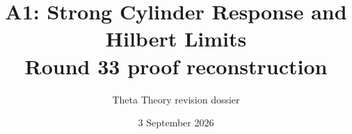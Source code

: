 \documentclass[11pt]{article}
\title{A1: Strong Cylinder Response and Hilbert Limits\\\large Round 33 proof reconstruction}
\author{Theta Theory revision dossier}
\date{3 September 2026}
\begin{document}
\maketitle
\reviewnote

\end{document}

